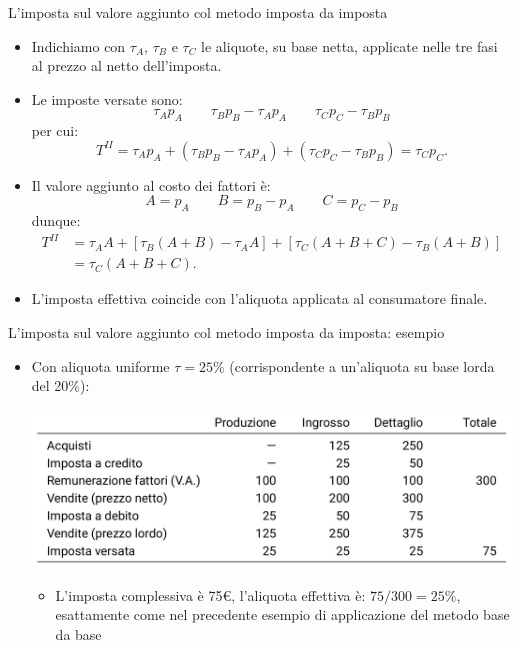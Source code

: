 \documentclass[11pt,italian]{beamer}
\begin{document}
\begin{frame}{L'imposta sul valore aggiunto col metodo imposta da imposta}
\begin{itemize}
\item Indichiamo con $\tau_A$, $\tau_B$ e $\tau_C$ le aliquote, su base netta,
applicate nelle tre fasi al prezzo al netto dell'imposta.
\item Le imposte versate sono:
\begin{equation*}
\tau_Ap_A \qquad \tau_Bp_B-\tau_Ap_A \qquad \tau_Cp_C-\tau_Bp_B
\end{equation*}
per cui:
\begin{equation*}
  T^{II}=\tau_Ap_A + (\tau_Bp_B-\tau_Ap_A) +
  (\tau_C p_C-\tau_Bp_B)=\tau_Cp_C.
\end{equation*}
\item Il valore aggiunto al costo dei fattori è:
\begin{equation*}
A=p_A \qquad B = p_B-p_A \qquad C=p_C-p_B
\end{equation*}
dunque:
\begin{equation*}
\begin{split}
  T^{II}&=\tau_AA + [\tau_B(A+B)-\tau_AA] + [\tau_C(A+B+C)-\tau_B(A+B)]\\
  &=\tau_C(A+B+C).
\end{split}
\end{equation*}
\item L'imposta effettiva coincide con l'aliquota applicata al consumatore finale.
\end{itemize}
\end{frame}

\begin{frame}{L'imposta sul valore aggiunto col metodo imposta da imposta: esempio}
\begin{itemize}
\item Con aliquota uniforme $\tau=25\%$ (corrispondente a un'aliquota su base
lorda del 20\%):
\begin{center}
\includegraphics[width=\textwidth]{./figure/esempio-imposta-da-imposta-1.png}
\end{center}
\begin{itemize}
\item L'imposta complessiva è 75€, l'aliquota effettiva è: $75/300=25\%$,
esattamente come nel precedente esempio di applicazione del metodo base da
base
\end{itemize}
\end{itemize}
\end{frame}
\end{document}
